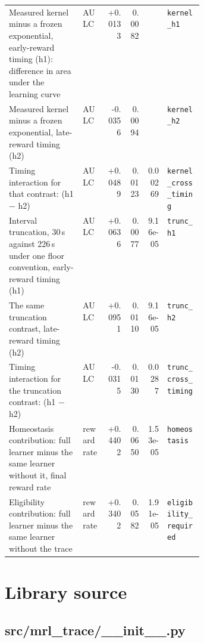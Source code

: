 \documentclass[a4paper,10pt]{article}
\begin{document}
\begin{longtable}{@{}p{0.38\linewidth} l r r r l@{}}
Measured kernel minus a frozen exponential, early-reward timing (h1): difference in area under the learning curve & AULC & +0.0133 & 0.0082 &  & \texttt{\scriptsize kernel\_h1} \\
Measured kernel minus a frozen exponential, late-reward timing (h2) & AULC & -0.0356 & 0.0094 &  & \texttt{\scriptsize kernel\_h2} \\
Timing interaction for that contrast: (h1 $-$ h2) & AULC & +0.0489 & 0.0123 & 0.00269 & \texttt{\scriptsize kernel\_cross\_timing} \\
Interval truncation, 30\,s against 226\,s under one floor convention, early-reward timing (h1) & AULC & +0.0636 & 0.0077 & 9.16e-05 & \texttt{\scriptsize trunc\_h1} \\
The same truncation contrast, late-reward timing (h2) & AULC & +0.0951 & 0.0110 & 9.16e-05 & \texttt{\scriptsize trunc\_h2} \\
Timing interaction for the truncation contrast: (h1 $-$ h2) & AULC & -0.0315 & 0.0130 & 0.0287 & \texttt{\scriptsize trunc\_cross\_timing} \\
Homeostasis contribution: full learner minus the same learner without it, final reward rate & reward rate & +0.4402 & 0.0650 & 1.53e-05 & \texttt{\scriptsize homeostasis} \\
Eligibility contribution: full learner minus the same learner without the trace & reward rate & +0.3402 & 0.0582 & 1.91e-05 & \texttt{\scriptsize eligibility\_required} \\
\end{longtable}
\section{Library source}
\label{sec:library}
\subsection{src/mrl\_trace/\_\_init\_\_.py}
\begin{Verbatim}

\end{Verbatim}
\end{document}
